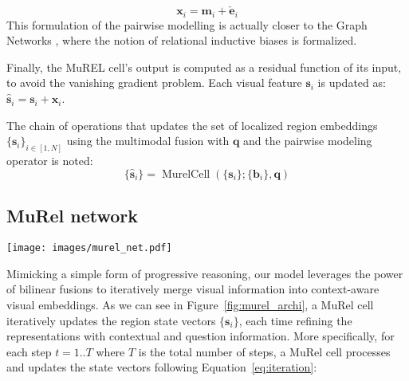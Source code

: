 \documentclass[10pt,twocolumn,letterpaper]{article}
\DeclareMathOperator*{\murelcell}{MurelCell}
\begin{document}
\begin{equation}
\label{eq:pairwise}
    \bm{x}_i = \bm{m}_i + \check{\bm{e}}_i
\end{equation}
This formulation of the pairwise modelling is actually closer to the Graph Networks \cite{DBLP:journals/corr/abs-1806-01261}, where the notion of relational inductive biases is formalized.

Finally, the MuREL cell's output is computed as a residual function of its input, to avoid the vanishing gradient problem. Each visual feature $\bm{s}_i$ is updated as: $\hat{\bm{s}}_i = \bm{s}_i + \bm{x}_i$.

The chain of operations that updates the set of localized region embeddings $\{\bm{s}_i\}_{i \in [1,N]}$ using the multimodal fusion with $\bm{q}$ and the pairwise modeling operator is noted:
\begin{equation}
    \{\hat{\bm{s}}_i\} = \murelcell \left( \{\bm{s}_i\}; \{\bm{b}_i\}, \bm{q} \right)
\end{equation}

\subsection{MuRel network}
\label{sub:murelnet}
\begin{figure*}
    \centering
    \texttt{[image: images/murel\_net.pdf]}
    \caption{\label{fig:murel_archi} \textbf{MuRel network.} The MuRel network merges the question embedding $\bm{q}$ into spatially-grounded visual representations $\{\bm{v}_i\}$ by iterating through a single MuRel cell. This module takes as input a set of localized vectors $\{\bm{s}_i\}$ and updates their representation using a multimodal fusion component. Moreover, it models all the possible pairwise relations between regions by combining spatial and semantic information. To construct the importance map at step $t$, we count the number of time each region provides the maximal value of $\max_i \{\bm{s}_i^t\}$ (over the 2048 dimensions).}
\end{figure*}


Mimicking a simple form of progressive reasoning, our model leverages the power of bilinear fusions to iteratively merge visual information into context-aware visual embeddings.
As we can see in Figure~\ref{fig:murel_archi}, a MuRel cell iteratively updates the region state vectors $\{\bm{s}_i\}$, each time refining the representations with contextual and question information. More specifically, for each step $t=1..T$ where $T$ is the total number of steps, a MuRel cell processes and updates the state vectors following Equation~\eqref{eq:iteration}:
\end{document}
